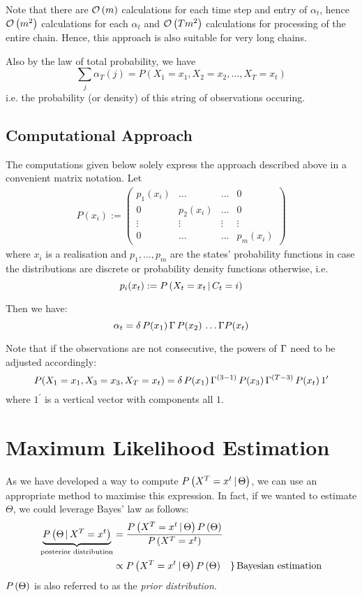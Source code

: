 Note that there are $\mathcal{O}\left(m\right)$ calculations for each time step and entry of $\alpha_t$, hence $\mathcal{O}\left(m^2\right)$ calculations for each $\alpha_t$ and $\mathcal{O}\left(T m^2\right)$ calculations for processing of the entire chain. Hence, this approach is also suitable for very long chains.
 
Also by the law of total probability, we have
\[
\sum_j \alpha_T(j) = P\left(X_1 = x_1, X_2 = x_2, \dots, X_T = x_t \right)
\] 
i.e. the probability (or density) of this string of observations occuring. 


\subsection{Computational Approach}

The computations given below solely express the approach described above in a convenient matrix notation. 
Let 
\begin{align*}
	P(x_i) := \begin{pmatrix}
		p_1(x_i) & \dots    & \dots & 0  \\
		0        & p_2(x_i) & \dots & 0  \\
		\vdots   & \vdots   & \vdots& \vdots \\ 
		0        & \dots    & \dots & p_m(x_i)
	\end{pmatrix}
\end{align*}
where $x_i$ is a realisation and $p_1, \dots, p_m$ are the states' probability functions in case the distributions are discrete or probability density functions otherwise, i.e.
\[
	p_i(x_t) := P\left(X_t = x_t \, | \, C_t = i\right)
\]

Then we have:
\[
\alpha_t = \delta \, P(x_1) \, \Gamma \, P(x_2) \, \dots \Gamma P(x_t)
\]

Note that if the observations are not consecutive, the powers of $\Gamma$ need to be adjusted accordingly:
\[
P(X_1 = x_1, X_3 = x_3, X_T = x_t) = \delta \,  P(x_1) \, \Gamma^{(3-1)} \,  P(x_3) \,  \Gamma^{(T-3)} \, P(x_t) \, 1^\prime
\]
where $1^\prime$ is a vertical vector with components all $1$. 



\section{Maximum Likelihood Estimation}

As we have developed a way to compute $P\left(X^T=x^t \, | \, \Theta\right)$, we can use an appropriate method to maximise this expression. In fact, if we wanted to estimate $\Theta$, we could leverage Bayes' law as follows:
\begin{align}
	\underbrace{P\left(\Theta \, | \, X^T=x^t\right)}_{\text{posterior distribution}} &= \frac{P\left(X^T=x^t \, | \, \Theta\right) P \left(\Theta\right)}{P \left(X^T=x^t\right)} \\
		&\propto P\left(X^T=x^t \, | \, \Theta\right) P \left(\Theta\right)  \quad \} \, \text{Bayesian estimation} 
	\label{bay_estimate}
\end{align}
$P \left(\Theta\right)$ is also referred to as the \textit{prior distribution}.


